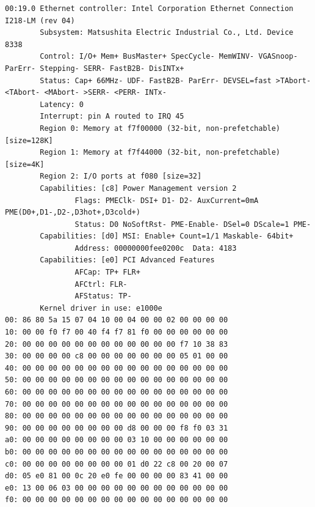 \documentclass[a4paper,11pt,report]{ltjsbook}
\begin{document}
\small
\begin{verbatim}
00:19.0 Ethernet controller: Intel Corporation Ethernet Connection I218-LM (rev 04)
        Subsystem: Matsushita Electric Industrial Co., Ltd. Device 8338
        Control: I/O+ Mem+ BusMaster+ SpecCycle- MemWINV- VGASnoop- ParErr- Stepping- SERR- FastB2B- DisINTx+
        Status: Cap+ 66MHz- UDF- FastB2B- ParErr- DEVSEL=fast >TAbort- <TAbort- <MAbort- >SERR- <PERR- INTx-
        Latency: 0
        Interrupt: pin A routed to IRQ 45
        Region 0: Memory at f7f00000 (32-bit, non-prefetchable) [size=128K]
        Region 1: Memory at f7f44000 (32-bit, non-prefetchable) [size=4K]
        Region 2: I/O ports at f080 [size=32]
        Capabilities: [c8] Power Management version 2
                Flags: PMEClk- DSI+ D1- D2- AuxCurrent=0mA PME(D0+,D1-,D2-,D3hot+,D3cold+)
                Status: D0 NoSoftRst- PME-Enable- DSel=0 DScale=1 PME-
        Capabilities: [d0] MSI: Enable+ Count=1/1 Maskable- 64bit+
                Address: 00000000fee0200c  Data: 4183
        Capabilities: [e0] PCI Advanced Features
                AFCap: TP+ FLR+
                AFCtrl: FLR-
                AFStatus: TP-
        Kernel driver in use: e1000e
00: 86 80 5a 15 07 04 10 00 04 00 00 02 00 00 00 00
10: 00 00 f0 f7 00 40 f4 f7 81 f0 00 00 00 00 00 00
20: 00 00 00 00 00 00 00 00 00 00 00 00 f7 10 38 83
30: 00 00 00 00 c8 00 00 00 00 00 00 00 05 01 00 00
40: 00 00 00 00 00 00 00 00 00 00 00 00 00 00 00 00
50: 00 00 00 00 00 00 00 00 00 00 00 00 00 00 00 00
60: 00 00 00 00 00 00 00 00 00 00 00 00 00 00 00 00
70: 00 00 00 00 00 00 00 00 00 00 00 00 00 00 00 00
80: 00 00 00 00 00 00 00 00 00 00 00 00 00 00 00 00
90: 00 00 00 00 00 00 00 00 d8 00 00 00 f8 f0 03 31
a0: 00 00 00 00 00 00 00 00 03 10 00 00 00 00 00 00
b0: 00 00 00 00 00 00 00 00 00 00 00 00 00 00 00 00
c0: 00 00 00 00 00 00 00 00 01 d0 22 c8 00 20 00 07
d0: 05 e0 81 00 0c 20 e0 fe 00 00 00 00 83 41 00 00
e0: 13 00 06 03 00 00 00 00 00 00 00 00 00 00 00 00
f0: 00 00 00 00 00 00 00 00 00 00 00 00 00 00 00 00
\end{verbatim}
\end{document}
